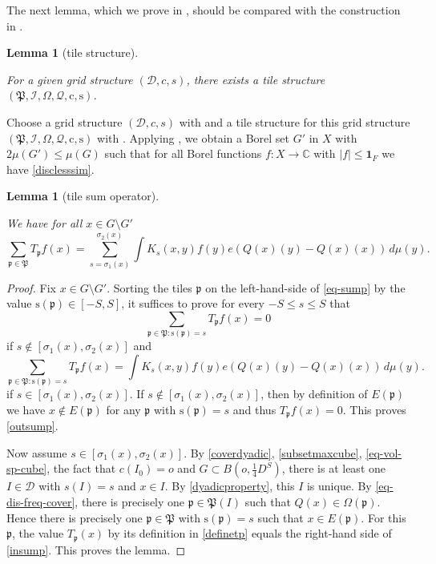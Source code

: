 \documentclass[10pt,a4paper]{article}
\theoremstyle{plain}
\newtheorem{lemma}[theorem]{Lemma}
\theoremstyle{definition}
\numberwithin{equation}{subsection}
\newcommand{\fp}{{\mathfrak p}}
\newcommand{\fP}{{\mathfrak P}}
\newcommand{\pc}{{\mathrm{c}}}
\newcommand{\ps}{{\mathrm{s}}}
\newcommand{\fc}{{\Omega}}
\newcommand{\scI}{{\mathcal{I}}} %
\newcommand{\tQ}{{Q}}
\newcommand{\fcc}{{\mathcal{Q}}}
\newcommand{\lean}[1]{}
\newcommand{\uses}[1]{}
\newcommand{\leanok}{}
\def\C{\mathbb{C}}
\begin{document}
The next lemma, which we prove in , should be compared
with the construction in \cite[Lemma 2.12]{zk-polynomial}.

\begin{lemma}[tile structure]
    \label{tile-structure}
    \leanok
    \lean{tile_existence}
    \uses{ball-metric-entropy,frequency-ball-cover,disjoint-frequency-cubes,frequency-cube-cover}
        For a given grid structure $(\mathcal{D}, c,s)$, there exists a tile structure
        $(\fP,\scI,\fc,\fcc,\pc,\ps)$.
\end{lemma}

Choose a grid structure $(\mathcal{D}, c,s)$ with  and a tile structure for this
grid structure $(\fP,\scI,\fc,\fcc,\pc,\ps)$ with .
Applying , we obtain a Borel set $G'$ in $X$ with $2\mu(G')\leq \mu(G)$ such that for all Borel functions $f:X\to \C$ with $|f|\le \mathbf{1}_F$
we have \eqref{disclesssim}.

\begin{lemma}[tile sum operator]
    \label{tile-sum-operator}
    \leanok
    \lean{tile_sum_operator, integrable_tile_sum_operator}
    We have for all $x\in G\setminus G'$
    \begin{equation}\label{eq-sump}
        \sum_{\fp\in \fP}T_{\fp} f(x)= \sum_{s=\sigma_1(x)}^{\sigma_2(x)}
        \int K_{s}(x,y) f(y) e(\tQ(x)(y)-\tQ(x)(x))\, d\mu(y).
    \end{equation}
\end{lemma}
\begin{proof}
    \leanok
    Fix $x\in G\setminus G'$.
    Sorting the tiles $\fp$ on the left-hand-side of \eqref{eq-sump} by the value $\ps(\fp)\in [-S,S]$,
    it suffices to prove for every $-S\le s\le S$ that
    \begin{equation}\label{outsump}
        \sum_{\fp\in \fP: \ps(\fp)=s}T_{\fp} f(x)=0
    \end{equation}
    if $s\not\in [\sigma_1(x), \sigma_2(x)]$ and
    \begin{equation}\label{insump}
        \sum_{\fp\in \fP: \ps(\fp)=s}T_{\fp} f(x)=
        \int K_{s}(x,y) f(y) e(\tQ(x)(y) - \tQ(x)(x))\, d\mu(y).
    \end{equation}
    if $s\in [\sigma_1(x),\sigma_2(x)]$.
    If $s\not\in [\sigma_1(x), \sigma_2(x)]$, then by definition of $E(\fp)$ we have
    $x\not\in E(\fp)$ for any $\fp$ with $\ps(\fp)=s$ and thus $T_{\fp} f(x)=0$. This proves
    \eqref{outsump}.

    Now assume $s\in [\sigma_1(x),\sigma_2(x)]$.
    By \eqref{coverdyadic}, \eqref{subsetmaxcube}, \eqref{eq-vol-sp-cube}, the fact that $c(I_0) = o$ and $G\subset B(o,\frac 14 D^S)$, there is at least
    one $I\in \mathcal{D}$ with $s(I)=s$ and $x\in I$.
    By \eqref{dyadicproperty}, this $I$ is unique. By \eqref{eq-dis-freq-cover}, there is precisely one $\fp\in \fP(I)$ such that
    $\tQ(x)\in \fc(\fp)$. Hence there is precisely one $\fp\in \fP$ with $\ps(\fp)=s$ such that
    $x\in E(\fp)$. For this $\fp$, the value $T_{\fp}(x)$ by its definition in \eqref{definetp}
    equals the right-hand side of \eqref{insump}. This proves the lemma.
\end{proof}
\end{document}
